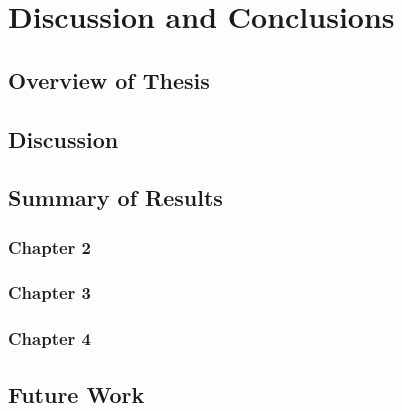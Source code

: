 \chapter{Discussion and Conclusions}
\citep{Abramowitz1965}
\section{Overview of Thesis}

\section{Discussion}

\section{Summary of Results}

\subsection{Chapter 2}

\subsection{Chapter 3}

\subsection{Chapter 4}

\section{Future Work}
